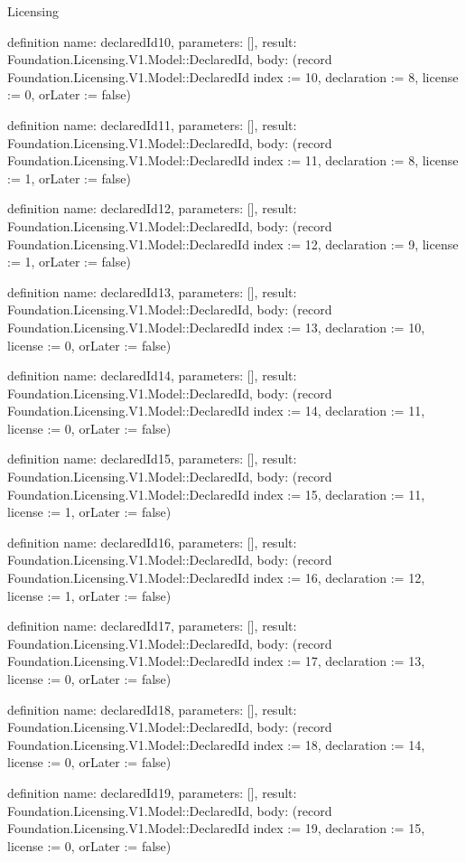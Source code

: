 \begin{lexlean}{Licensing}
\begin{semanticmodule}
definition{
  name: declaredId10,
  parameters: [],
  result: Foundation.Licensing.V1.Model::DeclaredId,
  body: (record Foundation.Licensing.V1.Model::DeclaredId {index := 10, declaration := 8, license := 0, orLater := false})
}

definition{
  name: declaredId11,
  parameters: [],
  result: Foundation.Licensing.V1.Model::DeclaredId,
  body: (record Foundation.Licensing.V1.Model::DeclaredId {index := 11, declaration := 8, license := 1, orLater := false})
}

definition{
  name: declaredId12,
  parameters: [],
  result: Foundation.Licensing.V1.Model::DeclaredId,
  body: (record Foundation.Licensing.V1.Model::DeclaredId {index := 12, declaration := 9, license := 1, orLater := false})
}

definition{
  name: declaredId13,
  parameters: [],
  result: Foundation.Licensing.V1.Model::DeclaredId,
  body: (record Foundation.Licensing.V1.Model::DeclaredId {index := 13, declaration := 10, license := 0, orLater := false})
}

definition{
  name: declaredId14,
  parameters: [],
  result: Foundation.Licensing.V1.Model::DeclaredId,
  body: (record Foundation.Licensing.V1.Model::DeclaredId {index := 14, declaration := 11, license := 0, orLater := false})
}

definition{
  name: declaredId15,
  parameters: [],
  result: Foundation.Licensing.V1.Model::DeclaredId,
  body: (record Foundation.Licensing.V1.Model::DeclaredId {index := 15, declaration := 11, license := 1, orLater := false})
}

definition{
  name: declaredId16,
  parameters: [],
  result: Foundation.Licensing.V1.Model::DeclaredId,
  body: (record Foundation.Licensing.V1.Model::DeclaredId {index := 16, declaration := 12, license := 1, orLater := false})
}

definition{
  name: declaredId17,
  parameters: [],
  result: Foundation.Licensing.V1.Model::DeclaredId,
  body: (record Foundation.Licensing.V1.Model::DeclaredId {index := 17, declaration := 13, license := 0, orLater := false})
}

definition{
  name: declaredId18,
  parameters: [],
  result: Foundation.Licensing.V1.Model::DeclaredId,
  body: (record Foundation.Licensing.V1.Model::DeclaredId {index := 18, declaration := 14, license := 0, orLater := false})
}

definition{
  name: declaredId19,
  parameters: [],
  result: Foundation.Licensing.V1.Model::DeclaredId,
  body: (record Foundation.Licensing.V1.Model::DeclaredId {index := 19, declaration := 15, license := 0, orLater := false})
}


\end{semanticmodule}
\end{lexlean}
